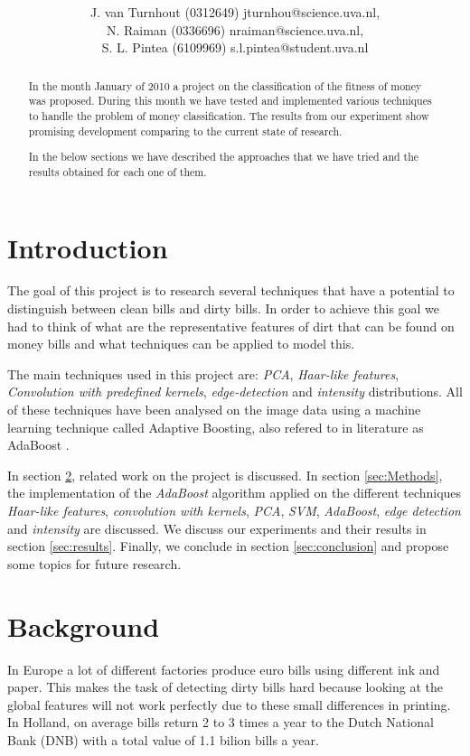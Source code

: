 \documentclass[11pt,twocolumn]{article}
\title{\tbf{Dirty Money:}\\\tbf{Feature selection using AdaBoost}}
\author{J. van Turnhout (0312649) jturnhou@science.uva.nl, 
	 \\ N. Raiman (0336696) nraiman@science.uva.nl, 
	 \\ S. L. Pintea (6109969) s.l.pintea@student.uva.nl}
\begin{document}
	\maketitle
	
	\begin{abstract}
		In the month January of 2010 a project on the classification of
		the fitness of money was proposed. During this month we have tested and
		implemented various techniques to handle the problem of money classification.
		The results from our experiment show promising development comparing to the
		current state of research.
		
		In the below sections we have described the approaches that we
		have tried and the results obtained for each one of them.
	\end{abstract}
	
	\section{Introduction}
		The goal of this project is to research several techniques that have a potential to distinguish between clean bills and dirty bills. In order to achieve this goal we had to think of what are the representative features of dirt that can be found on money bills and what techniques can be applied to model this.
		 		
		The main techniques used in this project are: \emph{PCA}, \emph{Haar-like features}, \emph{Convolution with predefined kernels}, \emph{edge-detection} and \emph{intensity} distributions. All of these techniques have been analysed on the image data using a machine learning technique called Adaptive Boosting, also refered to in literature as AdaBoost \cite{Ada}.
		
		In section \ref{sec:Background}, related work on the project is discussed. In section \ref{sec:Methods}, the implementation of the \emph{AdaBoost} algorithm applied on the different techniques \emph{Haar-like features}, \emph{convolution with kernels}, \emph{PCA}, \emph{SVM}, \emph{AdaBoost}, \emph{edge detection} and \emph{intensity} are discussed. We discuss our experiments and their results in section \ref{sec:results}. Finally, we conclude in section \ref{sec:conclusion} and propose some topics for future research.
	\section{Background}\label{sec:Background}
		In Europe a lot of different factories produce euro bills using different ink and paper. This makes the task of detecting dirty bills hard because looking at the global features will not work perfectly due to these small differences in printing. In Holland, on average bills return 2 to 3 times a year to the Dutch National Bank (DNB) with a total value of 1.1 bilion bills a year. 
\end{document}
